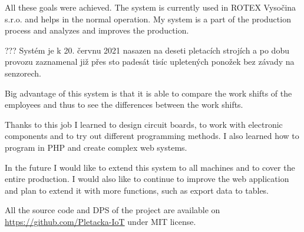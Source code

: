 \documentclass[12pt, a4paper]{article}
\begin{document}
All these goals were achieved.
The system is currently used in ROTEX Vysočina s.r.o. and helps in the normal operation.
My system is a part of the production process and analyzes and improves the production.

??? Systém je k 20. červnu 2021 nasazen na deseti pletacích strojích a po dobu provozu zaznamenal již přes sto padesát tisíc upletených ponožek bez závady na senzorech.

Big advantage of this system is that it is able to compare the work shifts of the employees and thus to see the differences between the work shifts.

Thanks to this job I learned to design circuit boards, to work with electronic components and to try out different programming methods.
I also learned how to program in PHP and create complex web systems.

In the future I would like to extend this system to all machines and to cover the entire production.
I would also like to continue to improve the web application and plan to extend it with more functions, such as export data to tables.

All the source code and DPS of the project are available on \url{https://github.com/Pletacka-IoT} under MIT license.


\newpage





\appendix
\end{document}
